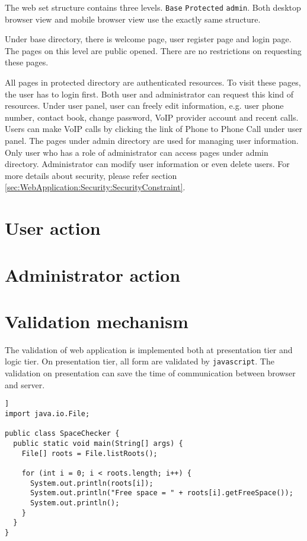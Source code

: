 The web set structure contains three levels. \texttt{Base} \textrightarrow{} \texttt{Protected} \textrightarrow{} \texttt{admin}. Both desktop browser view and mobile browser view use the exactly same structure. 

Under base directory, there is welcome page, user register page and login page. The pages on this level are public opened. There are no restrictions on requesting these pages. 

All pages in protected directory are authenticated resources. To visit these pages, the user has to login first. Both user and administrator can request this kind of resources. Under user panel, user can freely edit information, e.g. user phone number, contact book, change password, VoIP provider account and recent calls. Users can make VoIP calls by clicking the link of Phone to Phone Call under user panel. 
The pages under admin directory are used for managing user information. Only user who has a role of administrator can access pages under admin directory. Administrator can modify user information or even delete users. 
For more details about security, please refer section \ref{sec:WebApplication:Security:SecurityConstraint}.

\section{User action}
\label{sec:WebApplication:UserAction}


\section{Administrator action}
\label{sec:WebApplication:AdministratorAction}


\section{Validation mechanism}
\label{sec:WebApplication:ValidationMechanism}

The validation of web application is implemented both at presentation tier and logic tier. On presentation tier, all form are validated by \texttt{javascript}. The validation on presentation can save the time of communication between browser and server. 

\lstset{language=Java}
\begin{lstlisting}[frame=lines, float, caption=A floating example]]
import java.io.File;

public class SpaceChecker {
  public static void main(String[] args) {
    File[] roots = File.listRoots();

    for (int i = 0; i < roots.length; i++) {
      System.out.println(roots[i]);
      System.out.println("Free space = " + roots[i].getFreeSpace());
      System.out.println();
    }
  }
}

\end{lstlisting}


